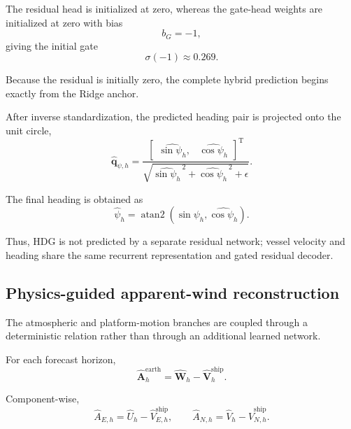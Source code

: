 The residual head is initialized at zero, whereas the gate-head weights are initialized at zero with bias
\begin{equation}
b_G=-1,
\end{equation}
giving the initial gate
\begin{equation}
\sigma(-1)
\approx
0.269.
\label{eq:initial_gate}
\end{equation}

Because the residual is initially zero, the complete hybrid prediction begins exactly from the Ridge anchor.

After inverse standardization, the predicted heading pair is projected onto the unit circle,
\begin{equation}
\hat{\mathbf q}_{\psi,h}
=
\frac{
\begin{bmatrix}
\widehat{\sin\psi_h},
&
\widehat{\cos\psi_h}
\end{bmatrix}^{\mathrm T}
}{
\sqrt{
\widehat{\sin\psi_h}^{\,2}
+
\widehat{\cos\psi_h}^{\,2}
+
\epsilon
}
}.
\label{eq:heading_normalization}
\end{equation}

The final heading is obtained as
\begin{equation}
\hat\psi_h
=
\operatorname{atan2}
\left(
\widehat{\sin\psi_h},
\widehat{\cos\psi_h}
\right).
\label{eq:heading_angle}
\end{equation}

Thus, HDG is not predicted by a separate residual network; vessel velocity and heading share the same recurrent representation and gated residual decoder.

\subsection{Physics-guided apparent-wind reconstruction}
\label{subsec:apparent_reconstruction}

The atmospheric and platform-motion branches are coupled through a deterministic relation rather than through an additional learned network.

For each forecast horizon,
\begin{equation}
\hat{\mathbf A}_{h}^{\mathrm{earth}}
=
\hat{\mathbf W}_{h}
-
\hat{\mathbf V}_{h}^{\mathrm{ship}}.
\label{eq:apparent_earth}
\end{equation}

Component-wise,
\begin{equation}
\hat A_{E,h}
=
\hat U_h
-
\hat V^{\mathrm{ship}}_{E,h},
\qquad
\hat A_{N,h}
=
\hat V_h
-
\hat V^{\mathrm{ship}}_{N,h}.
\label{eq:apparent_components}
\end{equation}

